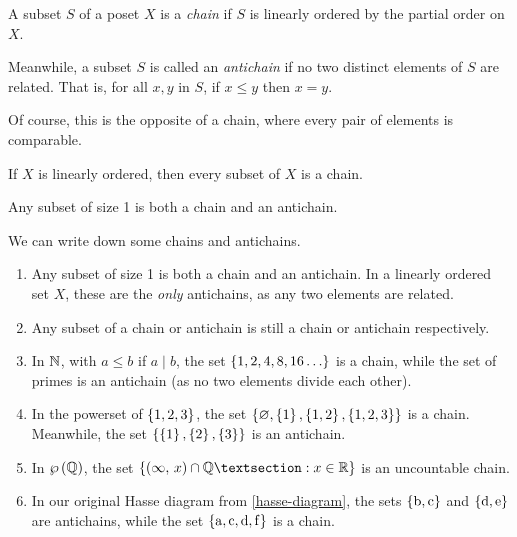 \documentclass{article}
\begin{document}
\begin{definition}
	\label{definition-chain-antichain}
    A subset $S$ of a poset $X$ is a \textit{chain} if $S$ is linearly ordered by the partial order on $X$.
    
    Meanwhile, a subset $S$ is called an \textit{antichain} if no two distinct elements of $S$ are related. That is, for all $x, y$ in $S$, if $x \leq y$ then $x = y$.
    
    Of course, this is the opposite of a chain, where every pair of elements is comparable.
\end{definition}

\begin{corollary}
    If $X$ is linearly ordered, then every subset of $X$ is a chain.
\end{corollary}

\begin{corollary}
    Any subset of size 1 is both a chain and an antichain.
\end{corollary}

\begin{example}
	We can write down some chains and antichains.
    \begin{enumerate}
    	\item Any subset of size 1 is both a chain and an antichain. In a linearly ordered set $X$, these are the \textit{only} antichains, as any two elements are related.
    	\item Any subset of a chain or antichain is still a chain or antichain respectively.
    	\item In $\mathbb{N}$, with $a \leq b$ if $a \mid b$, the set $\set{1, 2, 4, 8, 16 \dots}$ is a chain, while the set of primes is an antichain (as no two elements divide each other).
    	\item In the powerset of $\left\lbrace 1, 2, 3 \right\rbrace$, the set $\left\lbrace \varnothing, \left\lbrace 1 \right\rbrace, \left\lbrace 1, 2 \right\rbrace, \left\lbrace 1, 2, 3 \right\rbrace \right\rbrace$ is a chain. Meanwhile, the set $\left\lbrace \left\lbrace 1 \right\rbrace, \left\lbrace 2 \right\rbrace, \left\lbrace 3 \right\rbrace \right\rbrace$ is an antichain.
    	\item In $\wp\left(\mathbb{Q}\right)$, the set $\set{\intervalOO{\infty}{x} \cap \Q§ : x \in \R}$ is an uncountable chain.
    	\item In our original Hasse diagram from \ref{hasse-diagram}, the sets $\left\lbrace \mathrm{b, c} \right\rbrace$ and $\left\lbrace \mathrm{d, e} \right\rbrace$ are antichains, while the set $\left\lbrace \mathrm{a, c, d, f} \right\rbrace$ is a chain.
	\end{enumerate}
\end{example}
\end{document}
